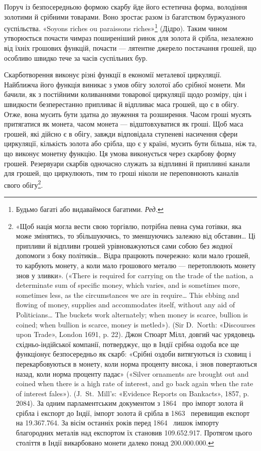 Поруч із безпосередньою формою скарбу йде його естетична
форма, володіння золотими й срібними товарами. Воно зростає
разом із багатством буржуазного суспільства. «Soyons riches
ou paraissons riches»\footnote*{
Будьмо багаті або видаваймося багатими. \emph{Ред.}
} (Дідро). Таким чином утворюється почасти
чимраз поширеніший ринок для золота й срібла, незалежно від
їхніх грошових функцій, почасти — лятентне джерело постачання
грошей, що особливо швидко тече за часів суспільних бур.

Скарботворення виконує різні функції в економії металевої
циркуляції. Найближча його функція виникає з умов обігу золотої\parbreak{}
або срібної монети. Ми бачили, як з постійними коливаннями
товарової циркуляції щодо розміру, цін і швидкости безперестанно
припливає й відпливає маса грошей, що є в обігу. Отже, вона
мусить бути здатна до звуження та розширення. Часом гроші
мусять притягатися як монета, часом монета — відштовхуватися
як гроші. Щоб маса грошей, які дійсно є в обігу, завжди відповідала
ступеневі насичення сфери циркуляції, кількість золота
або срібла, що є у країні, мусить бути більша, ніж та, що виконує
монетну функцію. Ця умова виконується через скарбову
форму грошей. Резервуари скарбів одночасно служать за відпливні
й припливні канали для грошей, що циркулюють, тим то
гроші ніколи не переповнюють каналів свого обігу\footnote{«Щоб нація могла вести свою торгівлю, потрібна певна сума
готівки, яка може змінятись, то збільшуючись, то зменшуючись залежно
від обставин\dots{} Ці припливи й відпливи грошей урівноважуються
сами собою без жодної допомоги з боку політиків\dots{} Відра працюють почережно:
коли мало грошей, то карбують монету, а коли мало грошового
металю — перетоплюють монету знов у зливки». («There is required for
carrying on the trade of the nation, a determinate sum of specific money,
which varies, and is sometimes more, sometimes less, as the circumstances
we are in require\dots{} This ebbing and flowing of money, supplies and accommodates
itself, without any aid of Politicians\dots{} The buckets work alternately;
when money is scarce, bullion is coined; when bullion is scarce, money
is metled»). (Sir D.~North: «Discourses upon Trade», London 1691, p. 22).
Джон Стюарт Мілл, довгий час урядовець східньо-індійської компанії,
потверджує, що в Індії срібна оздоба все ще функціонує безпосередньо як
скарб: «Срібні оздоби витягуються із сховищ і перекарбовуються в монету,
коли норма проценту висока, і знов повертаються назад, коли норма проценту
падає» («Silver ornaments are brought out and coined when there
is a high rate of interest, and go back again when the rate of interest fales»).
(J.~St.~Mill’s: «Evidence Reports on Bankacts», 1857, p. 2084). За одним
парламентським документом з 1864~ про імпорт золота й срібла і експорт
до Індії, імпорт золота й срібла в 1863~ перевищив експорт на \num{19.367.764}. За вісім останніх років перед 1864~ лишок імпорту
благородних металів над експортом їх становив \num{109.652.917}.
Протягом цього століття в Індії викарбовано монети далеко понад
\num{200.000.000}.}.

